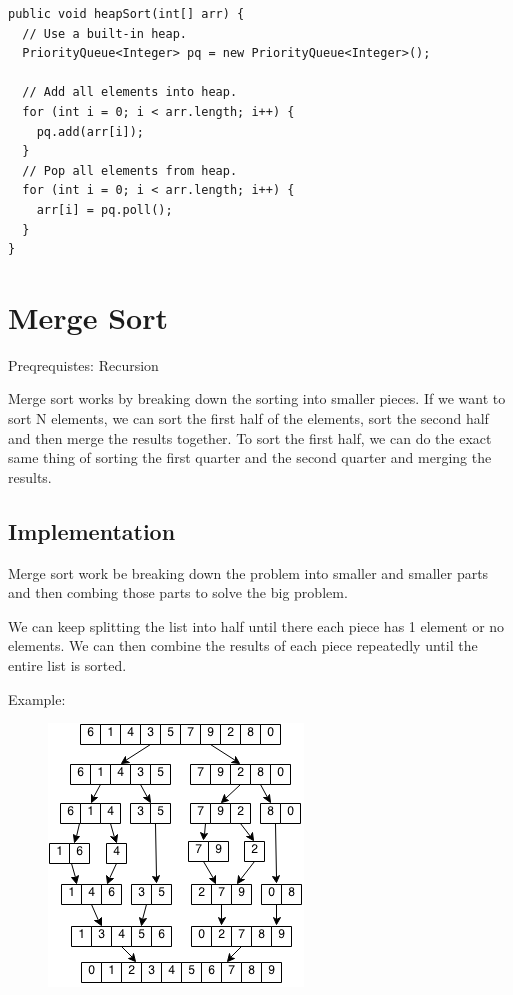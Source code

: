 \documentclass[11pt,oneside]{book}
\makeatletter
\def\maxwidth#1{\ifdim\Gin@nat@width>#1 #1\else\Gin@nat@width\fi}
\makeatother
\begin{document}
\begin{lstlisting}
public void heapSort(int[] arr) {
  // Use a built-in heap.
  PriorityQueue<Integer> pq = new PriorityQueue<Integer>();

  // Add all elements into heap.
  for (int i = 0; i < arr.length; i++) {
    pq.add(arr[i]);
  }
  // Pop all elements from heap.
  for (int i = 0; i < arr.length; i++) {
    arr[i] = pq.poll();
  }
}
\end{lstlisting}

        \section{ Merge Sort }
        

Preqrequistes: Recursion

Merge sort works by breaking down the sorting into smaller pieces. If we want to sort N elements, we can sort the first half of the elements, sort the second half and then merge the results together. To sort the first half, we can do the exact same thing of sorting the first quarter and the second quarter and merging the results.

\subsection{Implementation}

Merge sort work be breaking down the problem into smaller and smaller parts and then combing those parts to solve the big problem.

We can keep splitting the list into half until there each piece has 1 element or no elements. We can then combine the results of each piece repeatedly until the entire list is sorted.

Example:

\vspace{5px}\begin{figure}[H]\centering
        \includegraphics[width=0.66\maxwidth{\textwidth}]{mergesort.png}
        \end{figure}
\end{document}
